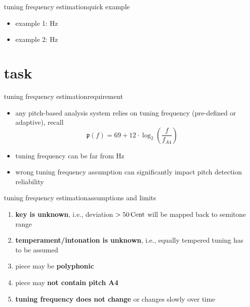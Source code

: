        \begin{frame}{tuning frequency estimation}{quick example}
            
            
                
                \begin{itemize}
                    \item example 1: \unit[443]{Hz}
                    \item example 2: \unit[440]{Hz}
                \end{itemize}
       \end{frame}
        
    \section{task}
       \begin{frame}{tuning frequency estimation}{requirement}
    
            \begin{itemize}
                \item   any pitch-based analysis system relies on tuning frequency (pre-defined or adaptive), recall \[ \mathfrak{p}(f)= 69 + 12\cdot\log_2\left(\frac{f}{f_{A4}}\right)\]
                \item   tuning frequency can be far from \unit[440]{Hz}
                \bigskip
                \item<2->[$\Rightarrow$]   wrong tuning frequency assumption can significantly impact pitch detection reliability
            \end{itemize}
       \end{frame}
       \begin{frame}{tuning frequency estimation}{assumptions and limits}
            \begin{enumerate}
                \item   \textbf{key is unknown}, i.e., deviation $>\unit[50]{Cent}$ will be mapped back to semitone range
                \item   \textbf{temperament/intonation is unknown}, i.e., equally tempered tuning has to be assumed
                \item   piece may be \textbf{polyphonic}
                \item   piece may \textbf{not contain pitch A4}
                \item   \textbf{tuning frequency does not change} or changes slowly over time
            \end{enumerate}
       \end{frame}
